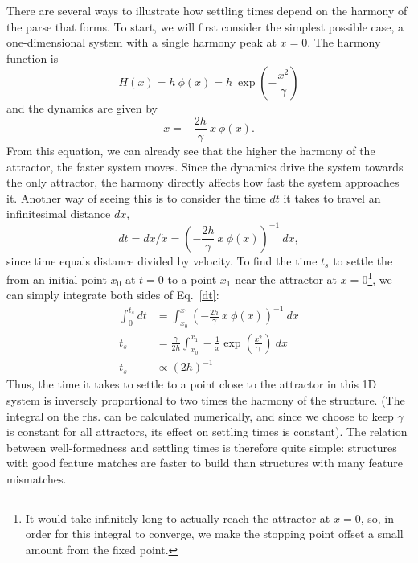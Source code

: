 \documentclass[10pt,letterpaper]{article}
\begin{document}
There are several ways to illustrate how settling times depend on the harmony of the parse that forms. To start, we will first consider the simplest possible case, a one-dimensional system with a single harmony peak at $x = 0$. The harmony function is $$H(x) = h~\phi(x) = h~\exp\left(-\frac{x^2}{\gamma} \right)$$ and the dynamics are given by 
\begin{equation}\label{dyn1d}
\dot{x} = -\frac{2h}{\gamma}~x~\phi(x).
\end{equation}
From this equation, we can already see that the higher the harmony of the attractor, the faster system moves. Since the dynamics drive the system towards the only attractor, the harmony directly affects how fast the system approaches it. Another way of seeing this is to consider the time $dt$ it takes to travel an infinitesimal distance $dx$,
\begin{equation}\label{dt}
dt  = dx/\dot{x} = \left(-\frac{2h}{\gamma}~x~\phi(x)\right)^{-1}~dx,
\end{equation}
since time equals distance divided by velocity. To find the time $t_s$ to settle the from an initial point $x_0$ at $t = 0$ to a point $x_1$ near the attractor at $x = 0$\footnote{It would take infinitely long to actually reach the attractor at $x = 0$, so, in order for this integral to converge, we make the stopping point offset a small amount from the fixed point.}, we can simply integrate both sides of Eq.~\ref{dt}:
\begin{align}\label{ts}
\int_{0}^{t_s} dt & = \int_{x_0}^{x_1} \left(-\frac{2h}{\gamma}~x~\phi(x)\right)^{-1}~dx \nonumber \\
t_s & = \frac{\gamma}{2h} \int_{x_0}^{x_1} -\frac{1}{x}\exp\left(\frac{x^2}{\gamma} \right)~dx \nonumber \\
t_s & \propto (2h)^{-1}
\end{align}
Thus, the time it takes to settle to a point close to the attractor in this 1D system is inversely proportional to two times the harmony of the structure. (The integral on the rhs. can be calculated numerically, and since we choose to keep $\gamma$ is constant for all attractors, its effect on settling times is constant). The relation between well-formedness and settling times is therefore quite simple: structures with good feature matches are faster to build than structures with many feature mismatches.
\end{document}
